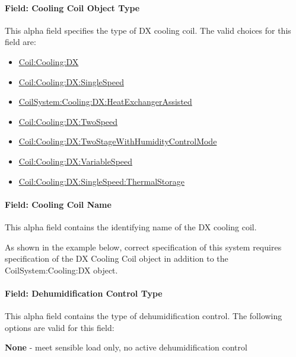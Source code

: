 \paragraph{Field: Cooling Coil Object Type}\label{field-cooling-coil-object-type-000}

This alpha field specifies the type of DX cooling coil. The valid choices for this field are:

\begin{itemize}
\item
  \hyperref[coilcoolingdx]{Coil:Cooling:DX}
\item
  \hyperref[coilcoolingdxsinglespeed]{Coil:Cooling:DX:SingleSpeed}
\item
  \hyperref[coilsystemcoolingdxheatexchangerassisted]{CoilSystem:Cooling:DX:HeatExchangerAssisted}
\item
  \hyperref[coilcoolingdxtwospeed]{Coil:Cooling:DX:TwoSpeed}
\item
  \hyperref[coilcoolingdxtwostagewithhumiditycontrolmode]{Coil:Cooling:DX:TwoStageWithHumidityControlMode}
\item
  \hyperref[coilcoolingdxvariablespeed]{Coil:Cooling:DX:VariableSpeed}
\item
  \hyperref[coilcoolingdxsinglespeedthermalstorage]{Coil:Cooling:DX:SingleSpeed:ThermalStorage}
\end{itemize}

\paragraph{Field: Cooling Coil Name}\label{field-cooling-coil-name-000}

This alpha field contains the identifying name of the DX cooling coil.

As shown in the example below, correct specification of this system requires specification of the DX Cooling Coil object in addition to the CoilSystem:Cooling:DX object.

\paragraph{Field: Dehumidification Control Type}\label{field-dehumidification-control-type}

This alpha field contains the type of dehumidification control. The following options are valid for this field:

\textbf{None} - meet sensible load only, no active dehumidification control

